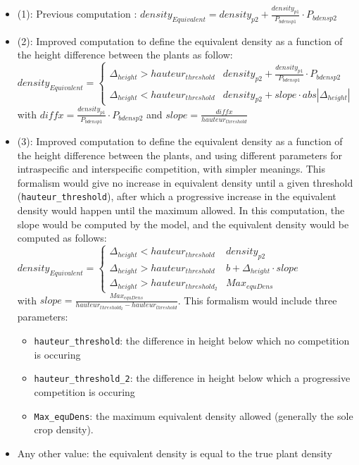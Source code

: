 \documentclass[]{book}
\begin{document}
\begin{itemize}
\item
  (1): Previous computation : \(density_{Equivalent}= density_{p2} + \frac{density_{p1}}{P_{bdensp1}}\cdot P_{bdensp2}\)
\item
  (2): Improved computation to define the equivalent density as a function of the height difference between the plants as follow:
  \(density_{Equivalent} =\begin{cases}\Delta_{height} > hauteur_{threshold} & density_{p2} + \frac{density_{p1}}{P_{bdensp1}}\cdot P_{bdensp2} \\ \Delta_{height} < hauteur_{threshold} & density_{p2}+slope\cdot abs\left|\Delta_{height}\right| \end{cases}\)\\
  with \(diffx= \frac{density_{p1}}{P_{bdensp1}}\cdot P_{bdensp2}\) and \(slope= \frac{diffx}{hauteur_{threshold}}\)
\item
  (3): Improved computation to define the equivalent density as a function of the height difference between the plants, and using different parameters for intraspecific and interspecific competition, with simpler meanings. This formalism would give no increase in equivalent density until a given threshold (\texttt{hauteur\_threshold}), after which a progressive increase in the equivalent density would happen until the maximum allowed. In this computation, the slope would be computed by the model, and the equivalent density would be computed as follows: \(density_{Equivalent} =\begin{cases}\Delta_{height} < hauteur_{threshold} & density_{p2} \\ \Delta_{height} > hauteur_{threshold} & b + \Delta_{height}\cdot slope \\ \Delta_{height} > hauteur_{threshold_2} & Max_{equDens} \end{cases}\)\\
  with \(slope= \frac{Max_{equDens}}{hauteur_{threshold_2}-hauteur_{threshold}}\).
  This formalism would include three parameters:

  \begin{itemize}
  \item
    \texttt{hauteur\_threshold}: the difference in height below which no competition is occuring
  \item
    \texttt{hauteur\_threshold\_2}: the difference in height below which a progressive competition is occuring
  \item
    \texttt{Max\_equDens}: the maximum equivalent density allowed (generally the sole crop density).
  \end{itemize}
\item
  Any other value: the equivalent density is equal to the true plant density
\end{itemize}
\end{document}
